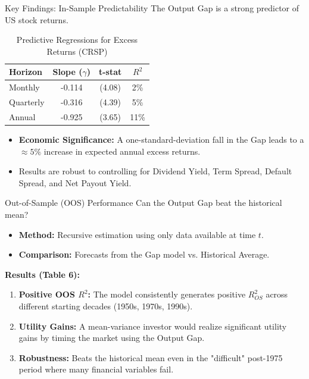 \documentclass{beamer}
\begin{document}
\begin{frame}{Key Findings: In-Sample Predictability}
    The Output Gap is a strong predictor of US stock returns.

    \begin{table}
    \centering
    \begin{tabular}{lccc}
        \toprule
        \textbf{Horizon} & \textbf{Slope ($\gamma$)} & \textbf{t-stat} & \textbf{$R^2$} \\
        \midrule
        Monthly & -0.114 & (4.08) & 2\% \\
        Quarterly & -0.316 & (4.39) & 5\% \\
        Annual & -0.925 & (3.65) & 11\% \\
        \bottomrule
    \end{tabular}
    \caption{Predictive Regressions for Excess Returns (CRSP)}
    \end{table}

    \begin{itemize}
        \item \textbf{Economic Significance:} A one-standard-deviation fall in the Gap leads to a $\approx 5\%$ increase in expected annual excess returns.
        \item Results are robust to controlling for Dividend Yield, Term Spread, Default Spread, and Net Payout Yield.
    \end{itemize}
\end{frame}

\begin{frame}{Out-of-Sample (OOS) Performance}
    Can the Output Gap beat the historical mean?
    
    \begin{itemize}
        \item \textbf{Method:} Recursive estimation using only data available at time $t$.
        \item \textbf{Comparison:} Forecasts from the Gap model vs. Historical Average.
    \end{itemize}

    \textbf{Results (Table 6):}
    \begin{enumerate}
        \item \textbf{Positive OOS $R^2$:} The model consistently generates positive $R^2_{OS}$ across different starting decades (1950s, 1970s, 1990s).
        \item \textbf{Utility Gains:} A mean-variance investor would realize significant utility gains by timing the market using the Output Gap.
        \item \textbf{Robustness:} Beats the historical mean even in the "difficult" post-1975 period where many financial variables fail.
    \end{enumerate}
\end{frame}
\end{document}
